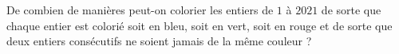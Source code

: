 De combien de manières peut-on colorier les entiers de $1$ à $2021$ de sorte que chaque entier est colorié soit en bleu, soit en vert, soit en rouge et de sorte que deux entiers consécutifs ne soient jamais de la même couleur ?